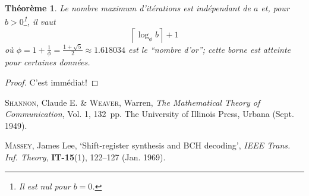 \documentclass[a4paper,twoside,10pt,english,french]{article}   %
\theoremstyle{definition}
\theoremstyle{remark}
\theoremstyle{plain}
\newtheorem{theoreme}{Théorème}[section]
\begin{document}
\begin{theoreme}
  Le nombre \emph{maximum} d'itérations est indépendant de $a$ et, pour $b>0$\footnote{Il est nul pour $b=0$.}, il vaut
    \[ \left\lceil \log_\phi b \right\rceil + 1 \]
  où $\phi=1+\frac{1}{\phi}=\frac{1+\sqrt{5}}{2}\approx1.618034$ est le \enquote{nombre d'or}; cette borne est atteinte pour certaines données.
\end{theoreme}
\begin{proof}
  C'est immédiat!
\end{proof}
%
\clearpage
\fancyhead[RO,LE]{}
\setlength{\parskip}{0pt}
\listoffigures
{}
\listoftables
{}
\lstlistoflistings
%
\begin{thebibliography}{99}

    \textsc{Shannon}, Claude E. \& \textsc{Weaver}, Warren,
    \emph{The Mathematical Theory of Communication},
    Vol\@. 1,
    132~pp.
    The University of Illinois Press, Urbana
    (Sept\@. 1949).

    \textsc{Massey}, James Lee,
    \enquote*{Shift-register synthesis and BCH decoding},
    \emph{IEEE Trans\@. Inf\@. Theory},
    \textbf{IT-15}(1),
    122--127
    (Jan\@. 1969).

\end{thebibliography}
%
\tableofcontents
\clearpage
\listoftodos
%
\end{document}
